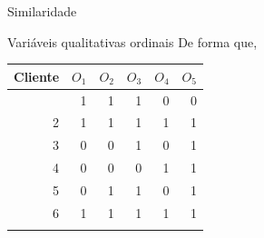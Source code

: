 \documentclass[
  ignorenonframetext,
  aspectratio=169,
]{beamer}
\newcounter{none} %
\begin{document}
\begin{frame}{Similaridade}
\protect{}\label{similaridade-6}
\begin{block}{Variáveis qualitativas ordinais}
\protect{}\label{variuxe1veis-qualitativas-ordinais-2}
De forma que,

{\def\LTcaptype{none} %
\begin{longtable}[]{@{}rrrrrr@{}}
\toprule\noalign{}
Cliente & \(O_1\) & \(O_2\) & \(O_3\) & \(O_4\) & \(O_5\) \\
\midrule\noalign{}
\endhead
1 & 1 & 1 & 1 & 0 & 0 \\
2 & 1 & 1 & 1 & 1 & 1 \\
3 & 0 & 0 & 1 & 0 & 1 \\
4 & 0 & 0 & 0 & 1 & 1 \\
5 & 0 & 1 & 1 & 0 & 1 \\
6 & 1 & 1 & 1 & 1 & 1 \\
\bottomrule\noalign{}
\end{longtable}
}
\end{block}
\end{frame}
\end{document}
